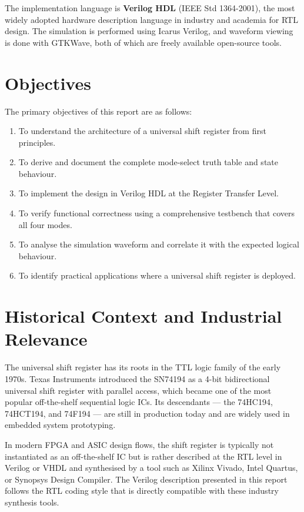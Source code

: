 \documentclass[12pt,a4paper]{report}
\begin{document}
The implementation language is \textbf{Verilog HDL} (IEEE Std 1364-2001), the most widely adopted hardware description language in industry and academia for RTL design. The simulation is performed using Icarus Verilog, and waveform viewing is done with GTKWave, both of which are freely available open-source tools.

\section{Objectives}

The primary objectives of this report are as follows:

\begin{enumerate}[leftmargin=2.5em, label=\arabic*.]
    \item To understand the architecture of a universal shift register from first principles.
    \item To derive and document the complete mode-select truth table and state behaviour.
    \item To implement the design in Verilog HDL at the Register Transfer Level.
    \item To verify functional correctness using a comprehensive testbench that covers all four modes.
    \item To analyse the simulation waveform and correlate it with the expected logical behaviour.
    \item To identify practical applications where a universal shift register is deployed.
\end{enumerate}

\section{Historical Context and Industrial Relevance}

The universal shift register has its roots in the TTL logic family of the early 1970s. Texas Instruments introduced the SN74194 as a 4-bit bidirectional universal shift register with parallel access, which became one of the most popular off-the-shelf sequential logic ICs. Its descendants — the 74HC194, 74HCT194, and 74F194 — are still in production today and are widely used in embedded system prototyping.

In modern FPGA and ASIC design flows, the shift register is typically not instantiated as an off-the-shelf IC but is rather described at the RTL level in Verilog or VHDL and synthesised by a tool such as Xilinx Vivado, Intel Quartus, or Synopsys Design Compiler. The Verilog description presented in this report follows the RTL coding style that is directly compatible with these industry synthesis tools.
\end{document}
